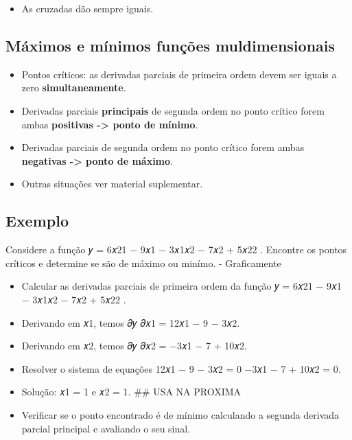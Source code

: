 \documentclass[
]{article}
\providecommand{\tightlist}{%
  \setlength{\itemsep}{0pt}\setlength{\parskip}{0pt}}
\begin{document}
\begin{itemize}
\tightlist
\item
  As cruzadas dão sempre iguais.
\end{itemize}

\hypertarget{muxe1ximos-e-muxednimos-funuxe7uxf5es-muldimensionais}{%
\subsection{Máximos e mínimos funções
muldimensionais}\label{muxe1ximos-e-muxednimos-funuxe7uxf5es-muldimensionais}}

\begin{itemize}
\tightlist
\item
  Pontos críticos: as derivadas parciais de primeira ordem devem ser
  iguais a zero \textbf{simultaneamente}.
\item
  Derivadas parciais \textbf{principais} de segunda ordem no ponto
  crítico forem ambas \textbf{positivas -\textgreater{} ponto de
  mínimo}.
\item
  Derivadas parciais de segunda ordem no ponto crítico forem ambas
  \textbf{negativas -\textgreater{} ponto de máximo}.
\item
  Outras situações ver material suplementar.
\end{itemize}

\hypertarget{exemplo-1}{%
\subsection{Exemplo}\label{exemplo-1}}

Considere a função 𝑦 = 6𝑥21 − 9𝑥1 − 3𝑥1𝑥2 − 7𝑥2 + 5𝑥22 . Encontre os
pontos críticos e determine se são de máximo ou minímo. - Graficamente

\begin{itemize}
\item
  Calcular as derivadas parciais de primeira ordem da função 𝑦 = 6𝑥21 −
  9𝑥1 − 3𝑥1𝑥2 − 7𝑥2 + 5𝑥22 .
\item
  Derivando em 𝑥1, temos 𝜕𝑦 𝜕𝑥1 = 12𝑥1 − 9 − 3𝑥2.
\item
  Derivando em 𝑥2, temos 𝜕𝑦 𝜕𝑥2 = −3𝑥1 − 7 + 10𝑥2.
\item
  Resolver o sistema de equações 12𝑥1 − 9 − 3𝑥2 = 0 −3𝑥1 − 7 + 10𝑥2 = 0.
\item
  Solução: 𝑥1 = 1 e 𝑥2 = 1. \#\# USA NA PROXIMA
\item
  Verificar se o ponto encontrado é de mínimo calculando a segunda
  derivada parcial principal e avaliando o seu sinal.
\end{itemize}
\end{document}
